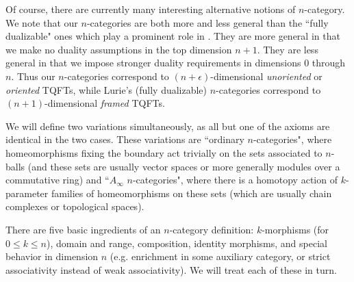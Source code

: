 \documentclass{pnastwo}
\def\nn#1{{{\color[rgb]{.2,.5,.6} \small [[#1]]}}}
\begin{document}
\begin{article}
%

Of course, there are currently many interesting alternative notions of $n$-category.
We note that our $n$-categories are both more and less general
than the ``fully dualizable" ones which play a prominent role in \cite{0905.0465}.
They are more general in that we make no duality assumptions in the top dimension $n{+}1$.
They are less general in that we impose stronger duality requirements in dimensions 0 through $n$.
Thus our $n$-categories correspond to $(n{+}\epsilon)$-dimensional {\it unoriented} or {\it oriented} TQFTs, while
Lurie's (fully dualizable) $n$-categories correspond to $(n{+}1)$-dimensional {\it framed} TQFTs.

We will define two variations simultaneously,  as all but one of the axioms are identical in the two cases.
These variations are ``ordinary $n$-categories", where homeomorphisms fixing the boundary
act trivially on the sets associated to $n$-balls
(and these sets are usually vector spaces or more generally modules over a commutative ring)
and ``$A_\infty$ $n$-categories",  where there is a homotopy action of
$k$-parameter families of homeomorphisms on these sets
(which are usually chain complexes or topological spaces).

There are five basic ingredients 
\cite{life-of-brian} of an $n$-category definition:
$k$-morphisms (for $0\le k \le n$), domain and range, composition,
identity morphisms, and special behavior in dimension $n$ (e.g. enrichment
in some auxiliary category, or strict associativity instead of weak associativity).
We will treat each of these in turn.


\end{article}
\end{document}

